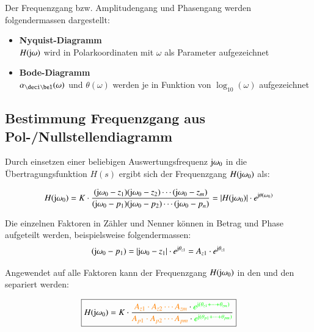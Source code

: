 Der Frequenzgang bzw. Amplitudengang und Phasengang werden folgendermassen dargestellt:

\begin{itemize}
    \item \textbf{Nyquist-Diagramm} \\
        $H(\mathrm{j} \omega)$ wird in Polarkoordinaten mit $\omega$ als Parameter aufgezeichnet 
    \item \textbf{Bode-Diagramm} \\
        $\alpha_{\deci \bel}(\omega)$ und $\theta(\omega)$ werden je in Funktion von $\log_{10}(\omega)$ aufgezeichnet
\end{itemize}


\subsection{Bestimmung Frequenzgang aus Pol-/Nullstellendiagramm}

Durch einsetzen einer beliebigen Auswertungsfrequenz $\mathrm{j} \omega_0$ in die Übertragungsfunktion $H(s)$ ergibt sich der
Frequenzgang $H(\mathrm{j} \omega_0)$ als:

$$ H(\mathrm{j} \omega_0) = K \cdot \frac{(\mathrm{j} \omega_0 - z_1) (\mathrm{j} \omega_0 - z_2) \cdots (\mathrm{j} \omega_0 - z_m)}
                                {(\mathrm{j} \omega_0 - p_1) (\mathrm{j} \omega_0 - p_2) \cdots (\mathrm{j} \omega_0 - p_n)}
                                = | H(\mathrm{j} \omega_0) | \cdot e^{\mathrm{j} \theta (\omega_0)} $$

Die einzelnen Faktoren in Zähler und Nenner können in Betrag und Phase aufgeteilt werden, beispielsweise folgendermassen:
$$ (\mathrm{j} \omega_0 - p_1) = |\mathrm{j} \omega_0 - z_1| \cdot e^{\mathrm{j} \theta_{z1}} = A_{z1} \cdot e^{\mathrm{j} \theta_{z1}} $$



Angewendet auf alle Faktoren kann der Frequenzgang $H(\mathrm{j} \omega_0)$ in den  und den
 separiert werden:

$$ \boxed{ H(\mathrm{j} \omega_0) = K \cdot \frac{{\color{orange}A_{z1} \cdot A_{z2} \cdots A_{zm}} \cdot {\color{green}e^{\ensuremath{\mathrm{j}}(\theta_{z1} + \cdots + \theta_{zm})}}}
                                        {{\color{orange}A_{p1} \cdot A_{p2} \cdots A_{pm}} \cdot {\color{green}e^{\ensuremath{\mathrm{j}}(\theta_{p1} + \cdots + \theta_{pm})}}} } $$

